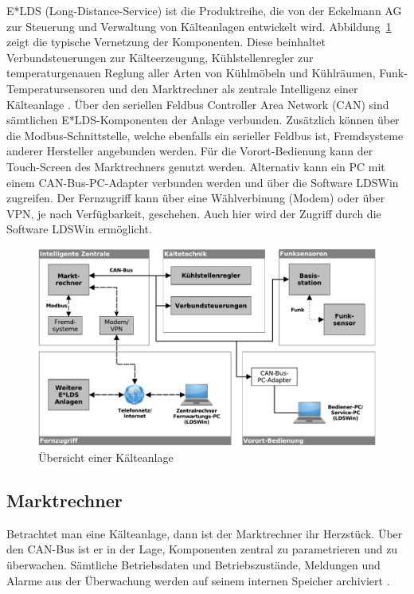\documentclass[11pt,a4paper]{report}
\begin{document}
E*LDS (Long-Distance-Service) ist die Produktreihe, die von der Eckelmann AG zur Steuerung und Verwaltung von Kälteanlagen entwickelt wird. Abbildung~\ref{fig:kaelteanlage} zeigt die typische Vernetzung der Komponenten. Diese beinhaltet Verbundsteuerungen zur Kälteerzeugung, Kühlstellenregler zur temperaturgenauen Reglung aller Arten von Kühlmöbeln und Kühlräumen, Funk-Temperatursensoren und den Marktrechner als zentrale Intelligenz einer Kälteanlage \cite{elds}. Über den seriellen Feldbus Controller Area Network (CAN) sind sämtlichen E*LDS-Komponenten der Anlage verbunden. Zusätzlich können über die Modbus-Schnittstelle, welche ebenfalls ein serieller Feldbus ist, Fremdsysteme anderer Hersteller angebunden werden. Für die Vorort-Bedienung kann der Touch-Screen des Marktrechners genutzt werden. Alternativ kann ein PC mit einem CAN-Bus-PC-Adapter verbunden werden und über die Software LDSWin zugreifen. Der Fernzugriff kann über eine Wählverbinung (Modem) oder über VPN, je nach Verfügbarkeit, geschehen. Auch hier wird der Zugriff durch die Software LDSWin ermöglicht.

\begin{figure}[htbp]
\centering
\includegraphics[scale=0.65]{images/kaelteanlage_uebersicht.pdf}
\caption{Übersicht einer Kälteanlage}
\label{fig:kaelteanlage}
\end{figure}

\subsection{Marktrechner} \label{sec:marktrechner} 
Betrachtet man eine Kälteanlage, dann ist der Marktrechner ihr Herzstück. Über den CAN-Bus ist er in der Lage, Komponenten zentral zu parametrieren und zu überwachen. Sämtliche Betriebsdaten und Betriebszustände, Meldungen und Alarme aus der Überwachung werden auf seinem internen Speicher archiviert \cite{elds}.
\end{document}
